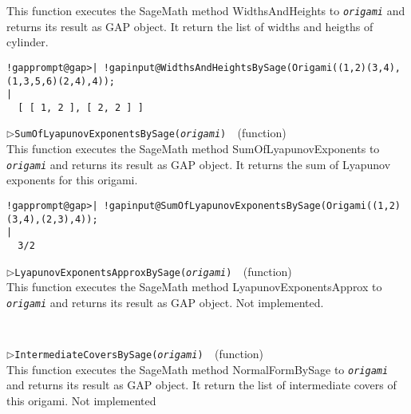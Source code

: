\documentclass[a4paper,11pt]{report}
\begin{document}
{{{ This function executes the SageMath method WidthsAndHeights to \mbox{\texttt{\mdseries\slshape origami}} and returns its result as \textsf{GAP} object. It return the list of widths and heigths of cylinder. 
\begin{Verbatim}[commandchars=!@|,fontsize=\small,frame=single,label=Example]
  !gapprompt@gap>| !gapinput@WidthsAndHeightsBySage(Origami((1,2)(3,4),(1,3,5,6)(2,4),4));        
|
  [ [ 1, 2 ], [ 2, 2 ] ]
\end{Verbatim}
 \noindent\textcolor{FuncColor}{$\triangleright$\enspace\texttt{SumOfLyapunovExponentsBySage({\mdseries\slshape origami})
\label{SumOfLyapunovExponentsBySage}
}\hfill{\scriptsize (function)}}\\


 This function executes the SageMath method SumOfLyapunovExponents to \mbox{\texttt{\mdseries\slshape origami}} and returns its result as \textsf{GAP} object. It returns the sum of Lyapunov exponents for this origami. 
\begin{Verbatim}[commandchars=!@|,fontsize=\small,frame=single,label=Example]
  !gapprompt@gap>| !gapinput@SumOfLyapunovExponentsBySage(Origami((1,2)(3,4),(2,3),4));
|
  3/2
\end{Verbatim}
 \noindent\textcolor{FuncColor}{$\triangleright$\enspace\texttt{LyapunovExponentsApproxBySage({\mdseries\slshape origami})
\label{LyapunovExponentsApproxBySage}
}\hfill{\scriptsize (function)}}\\


 This function executes the SageMath method LyapunovExponentsApprox to \mbox{\texttt{\mdseries\slshape origami}} and returns its result as \textsf{GAP} object. Not implemented. 
\begin{Verbatim}[commandchars=!@|,fontsize=\small,frame=single,label=Example]
  
\end{Verbatim}
 \noindent\textcolor{FuncColor}{$\triangleright$\enspace\texttt{IntermediateCoversBySage({\mdseries\slshape origami})
\label{IntermediateCoversBySage}
}\hfill{\scriptsize (function)}}\\


 This function executes the SageMath method NormalFormBySage to \mbox{\texttt{\mdseries\slshape origami}} and returns its result as \textsf{GAP} object. It return the list of intermediate covers of this origami. Not
implemented 
\begin{Verbatim}[commandchars=!@|,fontsize=\small,frame=single,label=Example]
\end{Verbatim}
 }

 }

 }
\end{document}

